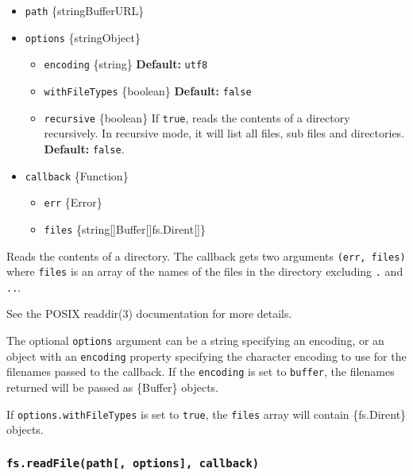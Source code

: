 \begin{itemize}
\tightlist
\item
  \texttt{path} \{string\textbar Buffer\textbar URL\}
\item
  \texttt{options} \{string\textbar Object\}

  \begin{itemize}
  \tightlist
  \item
    \texttt{encoding} \{string\} \textbf{Default:}
    \texttt{\textquotesingle{}utf8\textquotesingle{}}
  \item
    \texttt{withFileTypes} \{boolean\} \textbf{Default:} \texttt{false}
  \item
    \texttt{recursive} \{boolean\} If \texttt{true}, reads the contents
    of a directory recursively. In recursive mode, it will list all
    files, sub files and directories. \textbf{Default:} \texttt{false}.
  \end{itemize}
\item
  \texttt{callback} \{Function\}

  \begin{itemize}
  \tightlist
  \item
    \texttt{err} \{Error\}
  \item
    \texttt{files}
    \{string{[}{]}\textbar Buffer{[}{]}\textbar fs.Dirent{[}{]}\}
  \end{itemize}
\end{itemize}

Reads the contents of a directory. The callback gets two arguments
\texttt{(err,\ files)} where \texttt{files} is an array of the names of
the files in the directory excluding
\texttt{\textquotesingle{}.\textquotesingle{}} and
\texttt{\textquotesingle{}..\textquotesingle{}}.

See the POSIX readdir(3) documentation for more details.

The optional \texttt{options} argument can be a string specifying an
encoding, or an object with an \texttt{encoding} property specifying the
character encoding to use for the filenames passed to the callback. If
the \texttt{encoding} is set to
\texttt{\textquotesingle{}buffer\textquotesingle{}}, the filenames
returned will be passed as \{Buffer\} objects.

If \texttt{options.withFileTypes} is set to \texttt{true}, the
\texttt{files} array will contain \{fs.Dirent\} objects.

\subsubsection{\texorpdfstring{\texttt{fs.readFile(path{[},\ options{]},\ callback)}}{fs.readFile(path{[}, options{]}, callback)}}\label{fs.readfilepath-options-callback}

